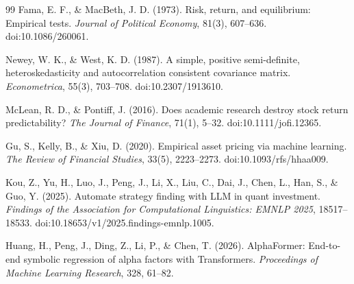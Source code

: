 \documentclass[UTF8,zihao=-4]{ctexart}
\theoremstyle{accentthm}
\begin{document}
\begin{thebibliography}{99}
  Fama, E. F., \& MacBeth, J. D. (1973).
  Risk, return, and equilibrium: Empirical tests.
  \emph{Journal of Political Economy}, 81(3), 607--636.
  doi:10.1086/260061.

  Newey, W. K., \& West, K. D. (1987).
  A simple, positive semi-definite, heteroskedasticity and autocorrelation consistent covariance matrix.
  \emph{Econometrica}, 55(3), 703--708.
  doi:10.2307/1913610.

  McLean, R. D., \& Pontiff, J. (2016).
  Does academic research destroy stock return predictability?
  \emph{The Journal of Finance}, 71(1), 5--32.
  doi:10.1111/jofi.12365.

  Gu, S., Kelly, B., \& Xiu, D. (2020).
  Empirical asset pricing via machine learning.
  \emph{The Review of Financial Studies}, 33(5), 2223--2273.
  doi:10.1093/rfs/hhaa009.

  Kou, Z., Yu, H., Luo, J., Peng, J., Li, X., Liu, C., Dai, J., Chen, L., Han, S., \& Guo, Y. (2025).
  Automate strategy finding with LLM in quant investment.
  \emph{Findings of the Association for Computational Linguistics: EMNLP 2025}, 18517--18533.
  doi:10.18653/v1/2025.findings-emnlp.1005.

  Huang, H., Peng, J., Ding, Z., Li, P., \& Chen, T. (2026).
  AlphaFormer: End-to-end symbolic regression of alpha factors with Transformers.
  \emph{Proceedings of Machine Learning Research}, 328, 61--82.
\end{thebibliography}
\end{document}
